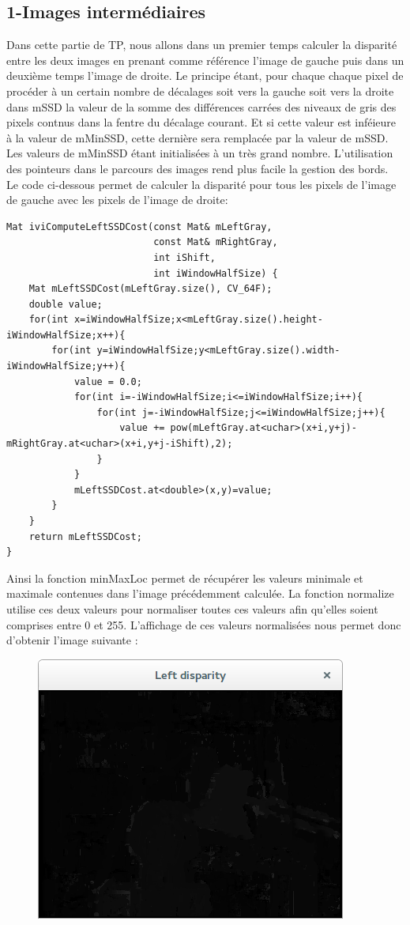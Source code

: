 \documentclass[a4paper,12pt]{report}
\begin{document}
\subsection*{1-Images intermédiaires}
Dans cette partie de TP, nous allons dans un premier temps calculer la disparité entre les deux images en prenant comme référence l'image de gauche puis dans un deuxième temps l'image de droite. Le principe étant, pour chaque chaque pixel de procéder à un certain nombre de décalages soit vers la gauche soit vers la droite  dans mSSD la valeur de la somme des différences carrées des niveaux de gris des pixels contnus dans la fentre du décalage courant. Et si cette valeur est inféieure à la valeur de mMinSSD, cette dernière sera remplacée par la valeur de mSSD. Les valeurs de mMinSSD étant initialisées à un très grand nombre. L'utilisation des pointeurs dans le parcours des images rend plus facile la gestion des bords.\\
\noindent Le code ci-dessous permet de calculer la disparité pour tous les pixels de l'image de gauche avec les pixels de l'image de droite:
\begin{lstlisting}[style=C++]
Mat iviComputeLeftSSDCost(const Mat& mLeftGray,
                          const Mat& mRightGray,
                          int iShift,
                          int iWindowHalfSize) {
    Mat mLeftSSDCost(mLeftGray.size(), CV_64F);
    double value;
    for(int x=iWindowHalfSize;x<mLeftGray.size().height-iWindowHalfSize;x++){
        for(int y=iWindowHalfSize;y<mLeftGray.size().width-iWindowHalfSize;y++){
            value = 0.0;
            for(int i=-iWindowHalfSize;i<=iWindowHalfSize;i++){
                for(int j=-iWindowHalfSize;j<=iWindowHalfSize;j++){
                    value += pow(mLeftGray.at<uchar>(x+i,y+j)-mRightGray.at<uchar>(x+i,y+j-iShift),2);
                }
            }
            mLeftSSDCost.at<double>(x,y)=value;
        }
    }
    return mLeftSSDCost;
}
\end{lstlisting}
\noindent Ainsi la fonction minMaxLoc permet de récupérer les valeurs minimale et maximale contenues dans l'image précédemment calculée. La fonction normalize utilise ces deux valeurs pour normaliser toutes ces valeurs afin qu'elles soient comprises entre 0 et 255. L'affichage de ces valeurs normalisées nous permet donc d'obtenir l'image suivante :
\begin{figure}[!ht]
	\center
	\includegraphics[scale=0.5]{./image/ld.png}
\end{figure}
\end{document}
